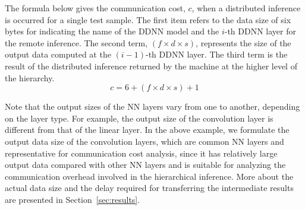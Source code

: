 \documentclass[format=acmsmall, review=false, screen=true]{acmart}
\def\figurename{Figure}
\def\sectionname{Section}
\begin{document}
The formula below gives the communication cost, $c$, when a distributed inference is occurred for a single test sample. The first item refers to the data size of six bytes for indicating the name of the DDNN model and the $i$-th DDNN layer for the remote inference. The second term, $( f \times d \times s )$, represents the size of the output data computed at the $(i-1)$-th DDNN layer. The third term is the result of the distributed inference returned by the machine at the higher level of the hierarchy.
$$ c = 6+ ( f \times d \times s ) + 1 $$

Note that the output sizes of the NN layers vary from one to another, depending on the layer type. For example, the output size of the convolution layer is different from that of the linear layer. In the above example, we formulate the output data size of the convolution layers, which are common NN layers and representative for communication cost analysis, since it has relatively large output data compared with other NN layers and is suitable for analyzing the communication overhead involved in the hierarchical inference.
More about the actual data size and the delay required for transferring the intermediate results are presented in \sectionname~\ref{sec:results}.

\end{document}
